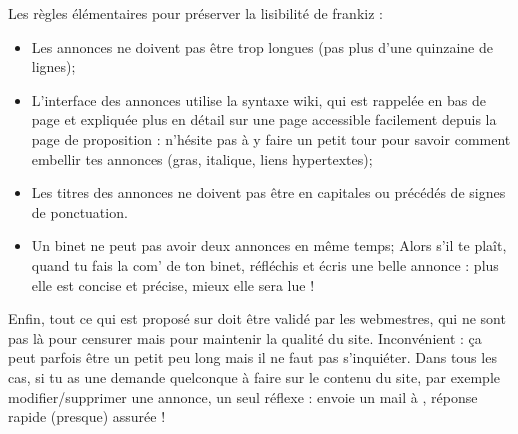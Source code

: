Les r\`egles \'el\'ementaires pour pr\'eserver la lisibilit\'e de frankiz :
\begin{itemize}
 \item Les annonces ne doivent pas \^etre trop longues (pas plus d'une quinzaine de lignes);
 \item L'interface des annonces utilise la syntaxe wiki, qui est rappel\'ee en bas de page et expliqu\'ee plus en d\'etail
        sur une page accessible facilement depuis la page de proposition :
        n'h\'esite pas \`a  y faire un petit tour pour savoir comment embellir tes annonces
        (gras, italique, liens hypertextes);
 \item Les titres des annonces ne doivent pas \^etre en capitales ou pr\'ec\'ed\'es de signes de ponctuation.
 \item Un binet ne peut pas avoir deux annonces en m\^eme temps;
       Alors s'il te pla\^it, quand tu fais la com' de ton binet, r\'efl\'echis et \'ecris une belle annonce :
       plus elle est concise et pr\'ecise, mieux elle sera lue !
\end{itemize}

Enfin, tout ce qui est propos\'e sur \fkz doit \^etre valid\'e par les
webmestres, qui ne sont pas l\`a  pour censurer mais pour maintenir la
qualit\'e du site. Inconv\'enient : \c ca peut parfois \^etre un petit peu
long mais il ne faut pas s'inqui\'eter. Dans tous les cas, si tu as une
demande quelconque \`a  faire sur le contenu du site, par exemple
modifier/supprimer une annonce, un seul r\'eflexe : envoie un mail \`a 
, r\'eponse rapide (presque) assur\'ee !


